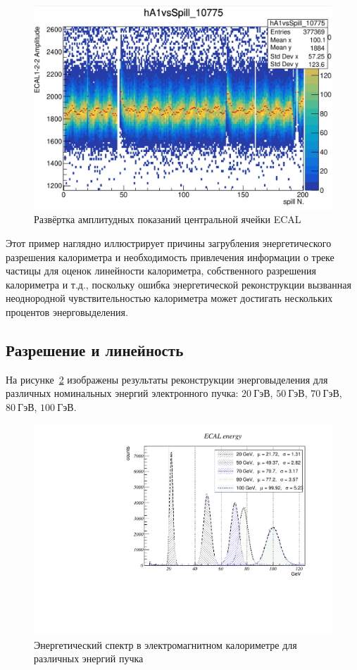 \begin{figure}
    \centering
    \includegraphics[width=1\linewidth]{images//illustrative/edep-fluctuations-run10775.png}
    \caption{Развёртка амплитудных показаний центральной ячейки ECAL}
    \label{fig:edep-fluctuations}
\end{figure}

Этот пример наглядно иллюстрирует причины загрубления энергетического
разрешения калориметра и необходимость привлечения информации о
треке частицы для оценок линейности калориметра, собственного
разрешения калориметра и т.д., поскольку ошибка энергетической
реконструкции вызванная неоднородной чувствительностью калориметра
может достигать нескольких процентов энерговыделения.

\subsection{Разрешение и линейность}

На рисунке~\ref{fig:ecal-linearity-test} изображены результаты
реконструкции энерговыделения для различных номинальных энергий
электронного пучка: $20~\text{ГэВ}$, $50~\text{ГэВ}$, $70~\text{ГэВ}$,
$80~\text{ГэВ}$, $100~\text{ГэВ}$.

\begin{figure}
    \centering
    \includegraphics[width=0.75\linewidth]{images/lintest-2.pdf}
    \caption{Энергетический спектр в электромагнитном калориметре
    для различных энергий пучка}
    \label{fig:ecal-linearity-test}
\end{figure}
